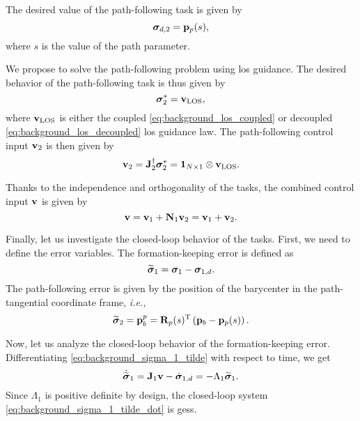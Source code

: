 The desired value of the path-following task is given by
\begin{equation}
    \bm{\sigma}_{d, 2} = \mathbf{p}_p(s),
\end{equation}
where $s$ is the value of the path parameter.

We propose to solve the path-following problem using \acrlong{los} guidance.
The desired behavior of the path-following task is thus given by
\begin{equation}
    \bm{\sigma}_2^{*} = \mathbf{v}_{\rm LOS},
\end{equation}
where $\mathbf{v}_{\rm LOS}$ is either the coupled \eqref{eq:background_los_coupled} or decoupled \eqref{eq:background_los_decoupled} \gls{los} guidance law.
The path-following control input $\mathbf{v}_2$ is then given by
\begin{equation}
    \mathbf{v}_2 = \mathbf{J}_2^{\dagger} \bm{\sigma}_2^{*} = \mathbf{1}_{N \times 1} \otimes \mathbf{v}_{\rm LOS}.
\end{equation}

Thanks to the independence and orthogonality of the tasks, the combined control input $\mathbf{v}$ is given by
\begin{equation}
    \mathbf{v} = \mathbf{v}_1 + \mathbf{N}_1 \mathbf{v}_2 = \mathbf{v}_1 + \mathbf{v}_2.
\end{equation}

Finally, let us investigate the closed-loop behavior of the tasks.
First, we need to define the error variables.
The formation-keeping error is defined as
\begin{equation}
    \widetilde{\bm{\sigma}}_1 = \bm{\sigma}_1 - \bm{\sigma}_{1, d}.
    \label{eq:background_sigma_1_tilde}
\end{equation}
The path-following error is given by the position of the barycenter in the path-tangential coordinate frame, \emph{i.e.,}
\begin{equation}
    \widetilde{\bm{\sigma}}_2 = \mathbf{p}_b^p = \mathbf{R}_p(s)^{\mathrm{T}} \left(\mathbf{p}_b - \mathbf{p}_p(s)\right).
    \label{eq:background_sigma_2_tilde}
\end{equation}

Now, let us analyze the closed-loop behavior of the formation-keeping error.
Differentiating \eqref{eq:background_sigma_1_tilde} with respect to time, we get
\begin{equation}
    \dot{\widetilde{\bm{\sigma}}}_1 = \mathbf{J}_1 \mathbf{v} - \dot{\bm{\sigma}}_{1, d} = - \Lambda_1 \widetilde{\bm{\sigma}}_1.
    \label{eq:background_sigma_1_tilde_dot}
\end{equation}
Since $\Lambda_1$ is positive definite by design, the closed-loop system \eqref{eq:background_sigma_1_tilde_dot} is \glspl{ges}.

